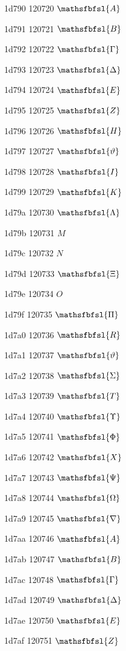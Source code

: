 \documentclass[11pt]{article}
\begin{document}
1d790 120720 \ensuremath{\mathsfbfsl{A}}

1d791 120721 \ensuremath{\mathsfbfsl{B}}

1d792 120722 \ensuremath{\mathsfbfsl{\Gamma}}

1d793 120723 \ensuremath{\mathsfbfsl{\Delta}}

1d794 120724 \ensuremath{\mathsfbfsl{E}}

1d795 120725 \ensuremath{\mathsfbfsl{Z}}

1d796 120726 \ensuremath{\mathsfbfsl{H}}

1d797 120727 \ensuremath{\mathsfbfsl{\vartheta}}

1d798 120728 \ensuremath{\mathsfbfsl{I}}

1d799 120729 \ensuremath{\mathsfbfsl{K}}

1d79a 120730 \ensuremath{\mathsfbfsl{\Lambda}}

1d79b 120731 \ensuremath{M}

1d79c 120732 \ensuremath{N}

1d79d 120733 \ensuremath{\mathsfbfsl{\Xi}}

1d79e 120734 \ensuremath{O}

1d79f 120735 \ensuremath{\mathsfbfsl{\Pi}}

1d7a0 120736 \ensuremath{\mathsfbfsl{R}}

1d7a1 120737 \ensuremath{\mathsfbfsl{\vartheta}}

1d7a2 120738 \ensuremath{\mathsfbfsl{\Sigma}}

1d7a3 120739 \ensuremath{\mathsfbfsl{T}}

1d7a4 120740 \ensuremath{\mathsfbfsl{\Upsilon}}

1d7a5 120741 \ensuremath{\mathsfbfsl{\Phi}}

1d7a6 120742 \ensuremath{\mathsfbfsl{X}}

1d7a7 120743 \ensuremath{\mathsfbfsl{\Psi}}

1d7a8 120744 \ensuremath{\mathsfbfsl{\Omega}}

1d7a9 120745 \ensuremath{\mathsfbfsl{\nabla}}

1d7aa 120746 \ensuremath{\mathsfbfsl{A}}

1d7ab 120747 \ensuremath{\mathsfbfsl{B}}

1d7ac 120748 \ensuremath{\mathsfbfsl{\Gamma}}

1d7ad 120749 \ensuremath{\mathsfbfsl{\Delta}}

1d7ae 120750 \ensuremath{\mathsfbfsl{E}}

1d7af 120751 \ensuremath{\mathsfbfsl{Z}}
\end{document}
